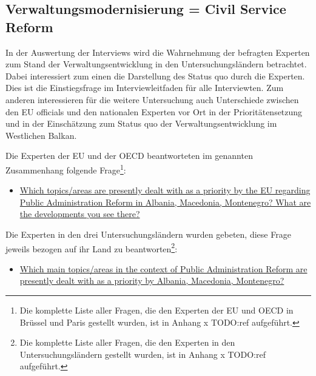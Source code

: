 \subsection{Verwaltungsmodernisierung = Civil Service Reform }
In der Auswertung der Interviews wird die Wahrnehmung der befragten Experten zum Stand der Verwaltungsentwicklung in den Untersuchungsländern betrachtet. Dabei interessiert zum einen die Darstellung des Status quo durch die Experten. Dies ist die Einstiegsfrage im Interviewleitfaden für alle Interviewten. Zum anderen interessieren für die weitere Untersuchung auch Unterschiede zwischen den EU officials und den nationalen Experten vor Ort in der Prioritätensetzung und in der Einschätzung zum Status quo der Verwaltungsentwicklung im Westlichen Balkan. 

Die Experten der EU und der OECD beantworteten im genannten Zusammenhang folgende Frage\footnote{Die komplette Liste aller Fragen, die den Experten der EU und OECD in Brüssel und Paris gestellt wurden, ist in Anhang x TODO:ref aufgeführt.}:
\begin{itemize}[label={}]
\item \ul{Which topics/areas are presently dealt with as a priority by the EU regarding Public Administration Reform in Albania, Macedonia, Montenegro? What are the developments you see there?}
\end{itemize}

Die Experten in den drei Untersuchungsländern wurden gebeten, diese Frage jeweils bezogen auf ihr Land zu beantworten\footnote{Die komplette Liste aller Fragen, die den Experten in den Untersuchungsländern gestellt wurden, ist in Anhang x TODO:ref aufgeführt.}:
\begin{itemize}[label={}]
\item \ul{Which main topics/areas in the context of Public Administration Reform are presently dealt with as a priority by Albania, Macedonia, Montenegro?}
\end{itemize}

